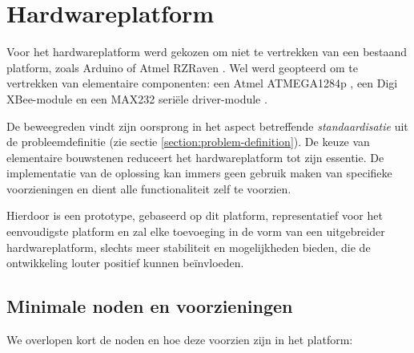
\chapter{Hardwareplatform}
\label{hardware-platform}

Voor het hardwareplatform werd gekozen om niet te vertrekken van een bestaand
platform, zoals Arduino \citep{url:arduino} of Atmel RZRaven
\citep{manual:rzraven}. Wel werd geopteerd om te vertrekken van elementaire
componenten: een Atmel ATMEGA1284p \mcu \citep{datasheet:atmega1284p}, een Digi
XBee-module \citep{manual:xbee} en een MAX232 seri\"ele driver-module
\citep{datasheet:max232}.

De beweegreden vindt zijn oorsprong in het aspect betreffende
\emph{standaardisatie} uit de probleemdefinitie (zie sectie
\ref{section:problem-definition}). De keuze van elementaire bouwstenen
reduceert het hardwareplatform tot zijn essentie. De implementatie van de
oplossing kan immers geen gebruik maken van specifieke voorzieningen en dient
alle functionaliteit zelf te voorzien.

Hierdoor is een prototype, gebaseerd op dit platform, representatief voor het
eenvoudigste platform en zal elke toevoeging in de vorm van een uitgebreider
hardwareplatform, slechts meer stabiliteit en mogelijkheden bieden, die de
ontwikkeling louter positief kunnen be\"invloeden.

\section{Minimale noden en voorzieningen}

We overlopen kort de noden en hoe deze voorzien zijn in het platform:

